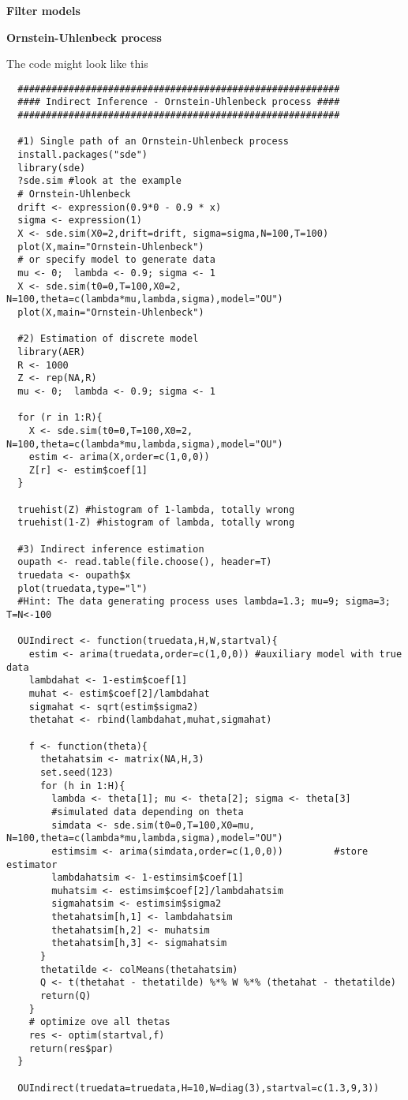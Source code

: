 \begin{Solution}{15.2}
\textbf{Filter models }
\end{Solution}
\begin{Solution}{15.4}
\textbf{Ornstein-Uhlenbeck process}

The code might look like this
\begin{verbatim}
  #########################################################
  #### Indirect Inference - Ornstein-Uhlenbeck process ####
  #########################################################

  #1) Single path of an Ornstein-Uhlenbeck process
  install.packages("sde")
  library(sde)
  ?sde.sim #look at the example
  # Ornstein-Uhlenbeck
  drift <- expression(0.9*0 - 0.9 * x)
  sigma <- expression(1)
  X <- sde.sim(X0=2,drift=drift, sigma=sigma,N=100,T=100)
  plot(X,main="Ornstein-Uhlenbeck")
  # or specify model to generate data
  mu <- 0;  lambda <- 0.9; sigma <- 1
  X <- sde.sim(t0=0,T=100,X0=2, N=100,theta=c(lambda*mu,lambda,sigma),model="OU")
  plot(X,main="Ornstein-Uhlenbeck")

  #2) Estimation of discrete model
  library(AER)
  R <- 1000
  Z <- rep(NA,R)
  mu <- 0;  lambda <- 0.9; sigma <- 1

  for (r in 1:R){
    X <- sde.sim(t0=0,T=100,X0=2, N=100,theta=c(lambda*mu,lambda,sigma),model="OU")
    estim <- arima(X,order=c(1,0,0))
    Z[r] <- estim$coef[1]
  }

  truehist(Z) #histogram of 1-lambda, totally wrong
  truehist(1-Z) #histogram of lambda, totally wrong

  #3) Indirect inference estimation
  oupath <- read.table(file.choose(), header=T)
  truedata <- oupath$x
  plot(truedata,type="l")
  #Hint: The data generating process uses lambda=1.3; mu=9; sigma=3; T=N<-100

  OUIndirect <- function(truedata,H,W,startval){
    estim <- arima(truedata,order=c(1,0,0)) #auxiliary model with true data
    lambdahat <- 1-estim$coef[1]
    muhat <- estim$coef[2]/lambdahat
    sigmahat <- sqrt(estim$sigma2)
    thetahat <- rbind(lambdahat,muhat,sigmahat)

    f <- function(theta){
      thetahatsim <- matrix(NA,H,3)
      set.seed(123)
      for (h in 1:H){
        lambda <- theta[1]; mu <- theta[2]; sigma <- theta[3]
        #simulated data depending on theta
        simdata <- sde.sim(t0=0,T=100,X0=mu, N=100,theta=c(lambda*mu,lambda,sigma),model="OU")
        estimsim <- arima(simdata,order=c(1,0,0))         #store estimator
        lambdahatsim <- 1-estimsim$coef[1]
        muhatsim <- estimsim$coef[2]/lambdahatsim
        sigmahatsim <- estimsim$sigma2
        thetahatsim[h,1] <- lambdahatsim
        thetahatsim[h,2] <- muhatsim
        thetahatsim[h,3] <- sigmahatsim
      }
      thetatilde <- colMeans(thetahatsim)
      Q <- t(thetahat - thetatilde) %*% W %*% (thetahat - thetatilde)
      return(Q)
    }
    # optimize ove all thetas
    res <- optim(startval,f)
    return(res$par)
  }

  OUIndirect(truedata=truedata,H=10,W=diag(3),startval=c(1.3,9,3))
\end{verbatim}
\end{Solution}

